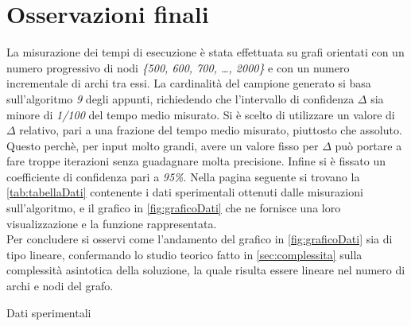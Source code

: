 \documentclass[10pt,a4paper,oneside,article,italian]{memoir}
\newcommand{\capitolo}{\newpage\chapter}
\theoremstyle{definition}
\begin{document}
\capitolo{Osservazioni finali}
La misurazione dei tempi di esecuzione è stata effettuata su grafi orientati con un numero progressivo di nodi \textit{\{500, 600, 700, \dots , 2000\}} e con un numero incrementale di archi tra essi. La cardinalità del campione generato si basa sull'algoritmo \textit{9} degli appunti, richiedendo che l'intervallo di confidenza $\Delta$ sia minore di \textit{1/100} del tempo medio misurato. Si è scelto di utilizzare un valore di $\Delta$ relativo, pari a una frazione del tempo medio misurato, piuttosto che assoluto. Questo perchè, per input molto grandi, avere un valore fisso per $\Delta$ può portare a fare troppe iterazioni senza guadagnare molta precisione. Infine si è fissato un coefficiente di confidenza pari a \textit{95\%}. Nella pagina seguente si trovano la \cref{tab:tabellaDati} contenente i dati sperimentali ottenuti dalle misurazioni sull'algoritmo, e il grafico in \cref{fig:graficoDati} che ne fornisce una loro visualizzazione e la funzione rappresentata.\\
Per concludere si osservi come l'andamento del grafico in \cref{fig:graficoDati} sia di tipo lineare, confermando lo studio teorico fatto in \cref{sec:complessita} sulla complessità asintotica della soluzione, la quale risulta essere lineare nel numero di archi e nodi del grafo.
\newpage
\begin{table}
\centering
\caption{Dati sperimentali}
\label{tab:tabellaDati}
\pgfplotstabletypeset[ %
	1000 sep={\,},
    columns={v, e, sum, E},
    columns/sum/.style={column name=$|V|+|E|$, sci, sci zerofill, sci sep align}
]{\timetable}
\end{table}
\end{document}
